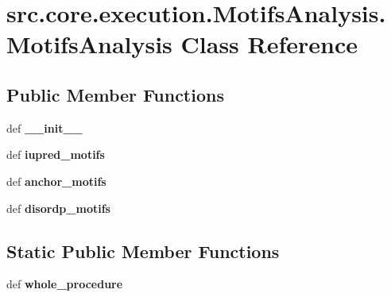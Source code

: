 \hypertarget{classsrc_1_1core_1_1execution_1_1MotifsAnalysis_1_1MotifsAnalysis}{\section{src.\-core.\-execution.\-Motifs\-Analysis.\-Motifs\-Analysis Class Reference}
\label{classsrc_1_1core_1_1execution_1_1MotifsAnalysis_1_1MotifsAnalysis}
}
\subsection*{Public Member Functions}
\begin{DoxyCompactItemize}
\item 
\hypertarget{classsrc_1_1core_1_1execution_1_1MotifsAnalysis_1_1MotifsAnalysis_a918e4875994c24e1a41534a881148df1}{def {\bfseries \-\_\-\-\_\-init\-\_\-\-\_\-}}\label{classsrc_1_1core_1_1execution_1_1MotifsAnalysis_1_1MotifsAnalysis_a918e4875994c24e1a41534a881148df1}

\item 
\hypertarget{classsrc_1_1core_1_1execution_1_1MotifsAnalysis_1_1MotifsAnalysis_a0bdcb665161e1e606c57464c8b67b702}{def {\bfseries iupred\-\_\-motifs}}\label{classsrc_1_1core_1_1execution_1_1MotifsAnalysis_1_1MotifsAnalysis_a0bdcb665161e1e606c57464c8b67b702}

\item 
\hypertarget{classsrc_1_1core_1_1execution_1_1MotifsAnalysis_1_1MotifsAnalysis_a89365f54ac0fa8e29b4cea3c0889b7ab}{def {\bfseries anchor\-\_\-motifs}}\label{classsrc_1_1core_1_1execution_1_1MotifsAnalysis_1_1MotifsAnalysis_a89365f54ac0fa8e29b4cea3c0889b7ab}

\item 
\hypertarget{classsrc_1_1core_1_1execution_1_1MotifsAnalysis_1_1MotifsAnalysis_aa177d2a61787792fd7e384180bd8feea}{def {\bfseries disordp\-\_\-motifs}}\label{classsrc_1_1core_1_1execution_1_1MotifsAnalysis_1_1MotifsAnalysis_aa177d2a61787792fd7e384180bd8feea}

\end{DoxyCompactItemize}
\subsection*{Static Public Member Functions}
\begin{DoxyCompactItemize}
\item 
\hypertarget{classsrc_1_1core_1_1execution_1_1MotifsAnalysis_1_1MotifsAnalysis_a3ed00e17082faead8831fe7e579699cc}{def {\bfseries whole\-\_\-procedure}}\label{classsrc_1_1core_1_1execution_1_1MotifsAnalysis_1_1MotifsAnalysis_a3ed00e17082faead8831fe7e579699cc}

\end{DoxyCompactItemize}
